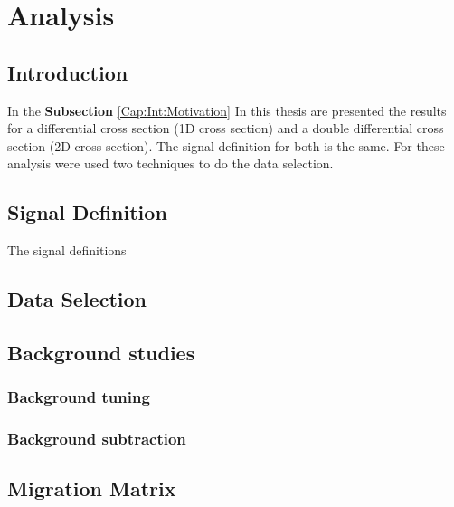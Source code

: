 \chapter{Analysis}
\minitoc
\label{Cap:Analysis}

\section{Introduction}
\label{Cap:Analysis:Introduction}
In the \textbf{Subsection} \ref{Cap:Int:Motivation} In this thesis are presented the results for a differential cross section (1D cross section) and a double differential cross section (2D cross section). The signal definition for both is the same. For these analysis were used two techniques to do the data selection.


\section{Signal Definition}
The signal definitions 
\section{Data Selection}



\section{Background studies}

\subsection{Background tuning}

\subsection{Background subtraction}

\section{Migration Matrix}


